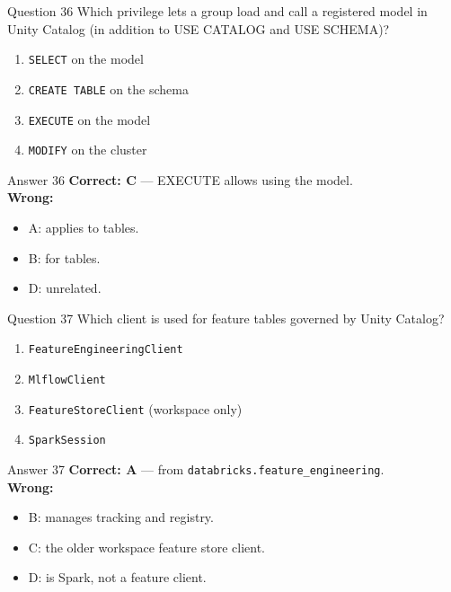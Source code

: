 \documentclass[aspectratio=169,11pt]{beamer}
\begin{document}
	\begin{frame}{Question 36}
		Which privilege lets a group load and call a registered model in Unity Catalog (in addition to USE CATALOG and USE SCHEMA)?
		\begin{enumerate}[label=\Alph*.]
			\item \texttt{SELECT} on the model
			\item \texttt{CREATE TABLE} on the schema
			\item \texttt{EXECUTE} on the model
			\item \texttt{MODIFY} on the cluster
		\end{enumerate}
	\end{frame}
	\begin{frame}{Answer 36}
		\textbf{Correct: C} --- EXECUTE allows using the model.\\
		\vspace{0.5em}
		\textbf{Wrong:}
		\begin{itemize}
			\item A: applies to tables.
			\item B: for tables.
			\item D: unrelated.
		\end{itemize}
	\end{frame}
	
	\begin{frame}{Question 37}
		Which client is used for feature tables governed by Unity Catalog?
		\begin{enumerate}[label=\Alph*.]
			\item \texttt{FeatureEngineeringClient}
			\item \texttt{MlflowClient}
			\item \texttt{FeatureStoreClient} (workspace only)
			\item \texttt{SparkSession}
		\end{enumerate}
	\end{frame}
	\begin{frame}{Answer 37}
		\textbf{Correct: A} --- from \texttt{databricks.feature\_engineering}.\\
		\vspace{0.5em}
		\textbf{Wrong:}
		\begin{itemize}
			\item B: manages tracking and registry.
			\item C: the older workspace feature store client.
			\item D: is Spark, not a feature client.
		\end{itemize}
	\end{frame}
	
\end{document}
